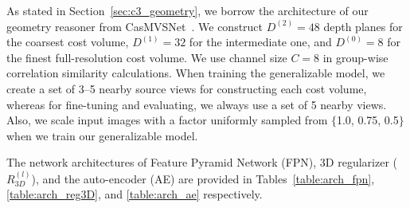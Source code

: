 As stated in Section~\ref{sec:c3_geometry}, we borrow the architecture of our geometry reasoner from CasMVSNet~\citep{gu2020cascade}. We construct $D^{(2)} = 48$ depth planes for the coarsest cost volume, $D^{(1)} = 32$ for the intermediate one, and $D^{(0)} = 8$ for the finest full-resolution cost volume. We use channel size $C = 8$ in group-wise correlation similarity calculations. When training the generalizable model, we create a set of 3$\textrm{--}$5 nearby source views for constructing each cost volume, whereas for fine-tuning and evaluating, we always use a set of 5 nearby views. Also, we scale input images with a factor uniformly sampled from $\{$1.0, 0.75, 0.5$\}$ when we train our generalizable model.

The network architectures of Feature Pyramid Network (FPN), 3D regularizer ($R^{(l)}_{3D}$), and the auto-encoder (AE) are provided in Tables~\ref{table:arch_fpn}, \ref{table:arch_reg3D}, and \ref{table:arch_ae} respectively.

